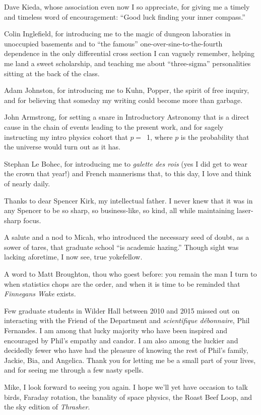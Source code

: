 Dave Kieda, whose association even now I so appreciate, for giving me a timely
and timeless word of encouragement: ``Good luck finding your inner compass.''

Colin Inglefield, for introducing me to the magic of dungeon laboraties in
unoccupied basements and to ``the famous'' one-over-sine-to-the-fourth
dependence in the only differential cross section I can vaguely remember,
helping me land a sweet scholarship, and teaching me about ``three-sigma''
personalities sitting at the back of the class.

Adam Johnston, for introducing me to Kuhn, Popper, the spirit of free inquiry,
and for believing that someday my writing could become more than garbage.

John Armstrong, for setting a snare in Introductory Astronomy that is a direct
cause in the chain of events leading to the present work, and for sagely
instructing my intro physics cohort that $p =$~1, where $p$ is the probability
that the universe would turn out as it has.

Stephan Le Bohec, for introducing me to \emph{galette des rois} (yes I did
get to wear the crown that year!) and French mannerisms that, to this day, I
love and think of nearly daily.

Thanks to dear Spencer Kirk, my intellectual father. I never knew that it was in
any Spencer to be so sharp, so business-like, so kind, all while maintaining
laser-sharp focus.

A salute and a nod to Micah, who introduced the necessary seed of doubt, as a
sower of tares, that graduate school ``is academic hazing.'' Though sight was
lacking aforetime, I now see, true yokefellow.

A word to Matt Broughton, thou who goest before: you remain the man I turn to
when statistics chops are the order, and when it is time to be reminded that
\textit{Finnegans Wake} exists.

Few graduate students in Wilder Hall between 2010 and 2015 missed out on
interacting with the Friend of the Department and \textit{scientifique
  d\'{e}bonnaire}, Phil Fernandes. I am among that lucky majority who have been
inspired and encouraged by Phil's empathy and candor. I am also among the
luckier and decidedly fewer who have had the pleasure of knowing the rest of
Phil's family, Jackie, Bia, and Angelica. Thank you for letting me be a small
part of your lives, and for seeing me through a few nasty spells.

Mike, I look forward to seeing you again. I hope we'll yet have occasion to talk
birds, Faraday rotation, the banality of space physics, the Roast Beef Loop, and
the sky edition of \textit{Thrasher}.

